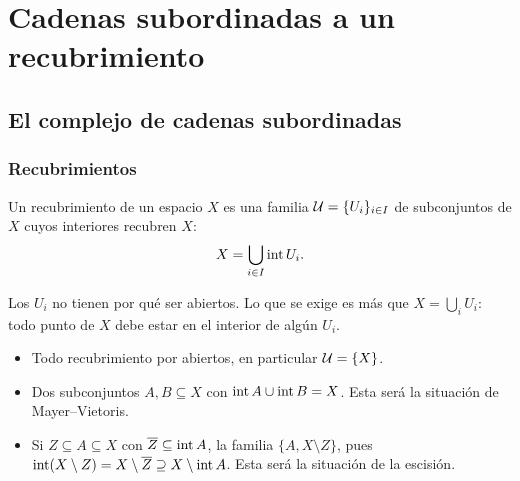 \section{Cadenas subordinadas a un recubrimiento}

\subsection{El complejo de cadenas subordinadas}

\begin{frame}[allowframebreaks]
  \frametitle{Recubrimientos}

  \begin{definition}
    Un \alert{recubrimiento} de un espacio $X$ es una familia $\mathcal{U}=\{U_i\}_{i\in I}$ de
    subconjuntos de $X$ cuyos interiores recubren $X$:
    \[
      X=\bigcup_{i\in I}\operatorname{int} U_i.
    \]
  \end{definition}

  Los $U_i$ no tienen por qué ser abiertos. Lo que se exige es más que
  $X=\bigcup_iU_i$: todo punto de $X$ debe estar en el interior de algún
  $U_i$.

  \framebreak

  \begin{example}
    \begin{itemize}
      \item Todo recubrimiento por abiertos, en particular $\mathcal{U}=\{X\}$.
      \item Dos subconjuntos $A,B\subseteq X$ con $\operatorname{int} A\cup\operatorname{int} B=X$. Esta
        será la situación de Mayer--Vietoris.
      \item Si $Z\subseteq A\subseteq X$ con $\overline{Z}\subseteq\operatorname{int} A$,
        la familia $\{A,X\setminus Z\}$, pues
        $\operatorname{int}(X\setminus Z)=X\setminus\overline{Z}\supseteq X\setminus\operatorname{int} A$.
        Esta será la situación de la escisión.

        \medskip

        \centering
    \end{itemize}
  \end{example}
\end{frame}


